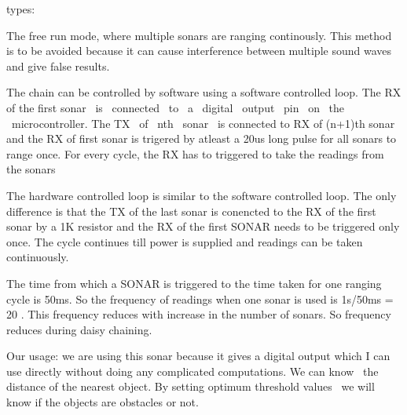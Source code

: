 \documentclass[letterpaper]{article}
\begin{document}
{
types:}


\bigskip

{
The free run mode, where multiple sonars are ranging continously. This
method is to be avoided because it can cause interference between
multiple sound waves and give false results.}


\bigskip

{
The chain can be controlled by software using a software controlled
loop. The RX of the first sonar \ is \ connected \ to \ a \ digital
\ output \ pin \ on \ the \ microcontroller. The TX \ of \ nth \ sonar
\ is connected to RX of (n+1)th sonar and the RX of first sonar is
trigered by atleast a 20us long pulse for all sonars to range once. For
every cycle, the RX has to triggered to take the readings from the
sonars}


\bigskip

{
The hardware controlled loop is similar to the software controlled loop.
The only difference is that the TX of the last sonar is conencted to
the RX of the first sonar by a 1K resistor and the RX of the first
SONAR needs to be triggered only once. The cycle continues till power
is supplied and readings can be taken continuously.}


\bigskip

{
The time from which a SONAR is triggered to the time taken for one
ranging cycle is 50ms. So the frequency of readings when one sonar is
used is 1s/50ms = 20 . This frequency reduces with increase in the
number of sonars. So frequency reduces during daisy chaining.}


\bigskip


\bigskip


\bigskip


\bigskip


\bigskip


\bigskip


\bigskip

{
Our usage: we are using this sonar because it gives a digital output
which I can use directly without doing any complicated computations. We
can know \ the distance of the nearest object. By setting optimum
threshold values \ we will know if the objects are obstacles or not.}

\clearpage\setcounter{page}{1}\pagestyle{Convertediii}

\bigskip
\end{document}
